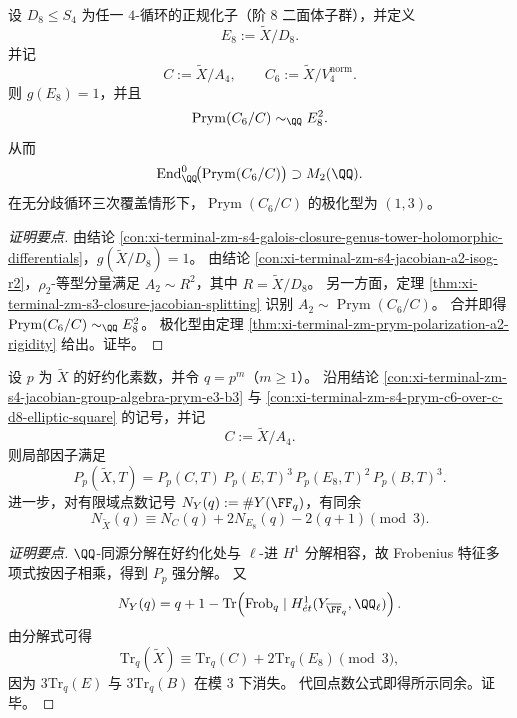 \begin{conclusion}\label{con:xi-terminal-zm-s4-prym-c6-over-c-d8-elliptic-square}
设 \(D_8\le S_4\) 为任一 \(4\)-循环的正规化子（阶 \(8\) 二面体子群），并定义
\[
E_8:=\widetilde{X}/D_8.
\]
并记
\[
C:=\widetilde{X}/A_4,\qquad C_6:=\widetilde{X}/V_4^{\mathrm{norm}}.
\]
则 \(g(E_8)=1\)，并且
\[
\operatorname{Prym}(C_6/C)\sim_{\QQ}E_8^2.
\]
从而
\[
\mathrm{End}^0_{\QQ}\!\bigl(\operatorname{Prym}(C_6/C)\bigr)\supset M_2(\QQ).
\]
在无分歧循环三次覆盖情形下，\(\operatorname{Prym}(C_6/C)\) 的极化型为 \((1,3)\)。
\end{conclusion}
\begin{proof}[证明要点]
由结论 \ref{con:xi-terminal-zm-s4-galois-closure-genus-tower-holomorphic-differentials}，\(g(\widetilde{X}/D_8)=1\)。
由结论 \ref{con:xi-terminal-zm-s4-jacobian-a2-isog-r2}，\(\rho_2\)-等型分量满足 \(A_2\sim R^2\)，其中 \(R=\widetilde{X}/D_8\)。
另一方面，定理 \ref{thm:xi-terminal-zm-s3-closure-jacobian-splitting} 识别 \(A_2\sim \operatorname{Prym}(C_6/C)\)。
合并即得 \(\operatorname{Prym}(C_6/C)\sim_{\QQ}E_8^2\)。
极化型由定理 \ref{thm:xi-terminal-zm-prym-polarization-a2-rigidity} 给出。证毕。
\end{proof}

\begin{conclusion}\label{con:xi-terminal-zm-s4-local-factorization-mod3-congruence-certificate}
设 \(p\) 为 \(\widetilde{X}\) 的好约化素数，并令 \(q=p^m\)（\(m\ge 1\)）。
沿用结论 \ref{con:xi-terminal-zm-s4-jacobian-group-algebra-prym-e3-b3} 与
\ref{con:xi-terminal-zm-s4-prym-c6-over-c-d8-elliptic-square} 的记号，并记
\[
C:=\widetilde{X}/A_4.
\]
则局部因子满足
\[
P_p(\widetilde{X},T)
=P_p(C,T)\,P_p(E,T)^3\,P_p(E_8,T)^2\,P_p(B,T)^3.
\]
进一步，对有限域点数记号 \(N_Y(q):=\#Y(\FF_q)\)，有同余
\[
N_{\widetilde{X}}(q)\equiv N_C(q)+2N_{E_8}(q)-2(q+1)\pmod 3.
\]
\end{conclusion}
\begin{proof}[证明要点]
\(\QQ\)-同源分解在好约化处与 \(\ell\)-进 \(H^1\) 分解相容，故 Frobenius 特征多项式按因子相乘，得到 \(P_p\) 强分解。
又
\[
N_Y(q)=q+1-\mathrm{Tr}\!\left(\mathrm{Frob}_q\mid H^1_{\acute et}(Y_{\overline{\FF}_q},\QQ_\ell)\right).
\]
由分解式可得
\[
\mathrm{Tr}_q(\widetilde{X})
\equiv \mathrm{Tr}_q(C)+2\mathrm{Tr}_q(E_8)\pmod 3,
\]
因为 \(3\mathrm{Tr}_q(E)\) 与 \(3\mathrm{Tr}_q(B)\) 在模 \(3\) 下消失。
代回点数公式即得所示同余。证毕。
\end{proof}


